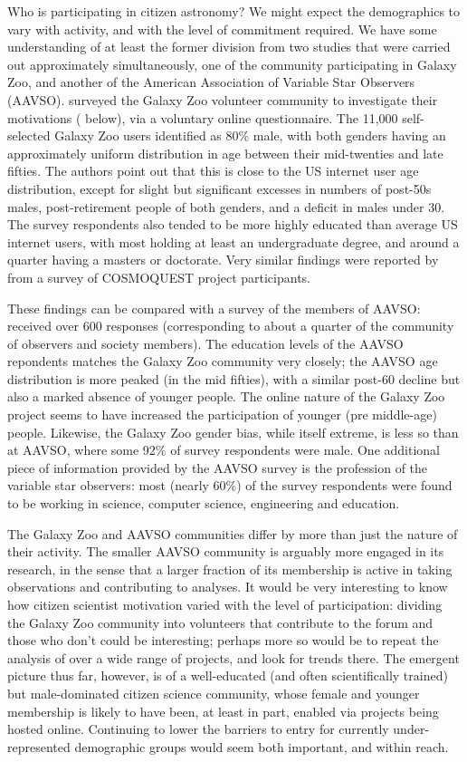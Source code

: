 \documentclass{ar2e}
\begin{document}
Who is participating in citizen astronomy? We might expect the demographics to
vary with activity, and with the level of commitment required. We have some
understanding of at least the former division from two studies that were
carried out approximately simultaneously, one of the community  participating
in Galaxy Zoo, and another of the American Association of Variable Star
Observers (AAVSO).  \citet{Rad++2013} surveyed the Galaxy Zoo volunteer
community to investigate their motivations (
below), via a voluntary online questionnaire. The 11,000 self-selected Galaxy
Zoo users identified as 80\% male, with both genders having an approximately
uniform distribution in age between their mid-twenties and late fifties. The
authors point out that this is close to the US internet user age distribution,
except for slight but significant excesses in numbers of post-50s males,
post-retirement people of both genders, and a deficit in males under 30. The
survey respondents  also tended to be more highly educated than average US
internet users, with most holding at least an undergraduate degree, and around
a quarter having a masters or doctorate. Very similar findings were reported
by \citet{COSMOQUESTsurvey} from a survey of COSMOQUEST project participants.

These findings can be compared with a survey of the members of AAVSO:
\citet{P+P2012} received over 600 responses (corresponding to about a quarter
of the community of observers and society members). The education levels of
the AAVSO repondents matches the Galaxy Zoo community very closely; the AAVSO
age distribution is more peaked (in the mid fifties), with a similar post-60
decline but also a marked absence of younger people. The online nature of the
Galaxy Zoo project seems to have increased the participation of younger (pre
middle-age) people. Likewise, the Galaxy Zoo gender bias, while itself
extreme, is less so than at AAVSO, where some 92\% of survey respondents were
male. One additional piece of information provided by the AAVSO survey is the
profession of the variable star observers: most (nearly 60\%) of the survey
respondents were found to be working in science, computer science, engineering
and education. 

The Galaxy Zoo and AAVSO communities differ by more than just the nature of
their activity. The smaller AAVSO community is arguably more engaged in its
research, in the sense that a larger fraction of its membership is active in
taking observations and contributing to analyses. It would be very interesting
to know how citizen scientist motivation varied with the level of
participation: dividing the Galaxy Zoo community into volunteers that
contribute to the  forum and those who don't could be interesting; perhaps
more so would be to repeat the analysis of \citeauthor{Rad++2013} over a wide
range of projects, and look for trends there. The emergent picture thus far,
however, is of a well-educated (and often scientifically trained)  but
male-dominated citizen science community, whose female and younger membership
is likely to have been, at least in part, enabled via projects being hosted
online. Continuing to lower the barriers to entry for currently
under-represented demographic groups would seem both important, and within
reach.
\end{document}
